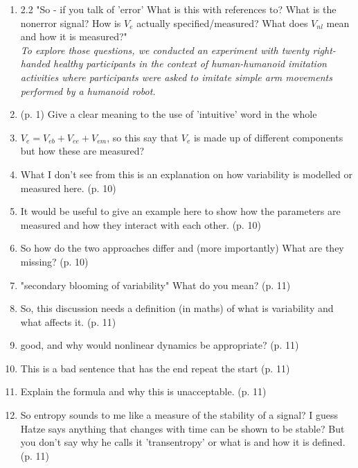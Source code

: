 \documentclass[10pt]{article}
\begin{document}
\begin{enumerate}[noitemsep,topsep=0pt]
\item 2.2 "So - if you talk of 'error'  What is this with references to?
	What is the nonerror signal?
	How is $V_e$ actually specified/measured?
	What does $V_{nl}$ mean and how it is measured?" \\


\textit{To explore those questions, we conducted an experiment 
with twenty right-handed healthy participants in the context 
of human-humanoid imitation activities where participants were asked to 
imitate simple arm movements performed by a humanoid robot.}

\item (p. 1) Give a clear meaning to the use of 'intuitive' word in the whole 


\item $V_e= V_{eb} +  V_{ee}+ V_{em}  $, so this say that $V_{e}$
	is made up of different components but 
	how these are measured?
\item What I don't see from this is an explanation on how variability 
	is modelled or measured here. (p. 10)

\item It would be useful to give an example here to show 
	how the parameters are measured and how they interact with each other. (p. 10)

\item So how do the two approaches differ and (more importantly)
	What are they missing? (p. 10)

\item "secondary blooming of variability" What do you mean? (p. 11)
	
\item So, this discussion needs a definition (in maths) of 
	what is variability and what affects it. (p. 11)

\item good, and why would nonlinear dynamics be appropriate? (p. 11)

\item This is a bad sentence that has the end repeat the start (p. 11)

\item Explain the formula and why this is unacceptable. (p. 11)

\item So entropy sounds to me like a measure of the stability 
	of a signal?
	I guess Hatze says anything that changes with time can be shown 
	to be stable?
	But you don't say why he calls it 'transentropy'
	or what is and how it is defined. (p. 11)


\end{enumerate}
\end{document}
